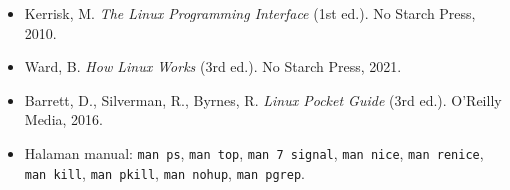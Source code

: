 \begin{itemize}
    \item Kerrisk, M. \textit{The Linux Programming Interface} (1st ed.). No Starch Press, 2010.
    \item Ward, B. \textit{How Linux Works} (3rd ed.). No Starch Press, 2021.
    \item Barrett, D., Silverman, R., Byrnes, R. \textit{Linux Pocket Guide} (3rd ed.). O'Reilly Media, 2016.
    \item Halaman manual: \texttt{man ps}, \texttt{man top}, \texttt{man 7 signal}, \texttt{man nice}, \texttt{man renice}, \texttt{man kill}, \texttt{man pkill}, \texttt{man nohup}, \texttt{man pgrep}.
\end{itemize}
